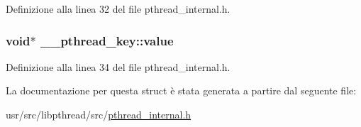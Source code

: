 Definizione alla linea 32 del file pthread\+\_\+internal.\+h.

\hypertarget{struct____pthread__key_a35d38627e4a0de2e247671f0b5b6322a}{
\subsubsection[{value}]{\setlength{\rightskip}{0pt plus 5cm}void$\ast$ \+\_\+\+\_\+pthread\+\_\+key\+::value}}\label{struct____pthread__key_a35d38627e4a0de2e247671f0b5b6322a}


Definizione alla linea 34 del file pthread\+\_\+internal.\+h.



La documentazione per questa struct è stata generata a partire dal seguente file\+:\begin{DoxyCompactItemize}
\item 
usr/src/libpthread/src/\hyperlink{pthread__internal_8h}{pthread\+\_\+internal.\+h}\end{DoxyCompactItemize}
